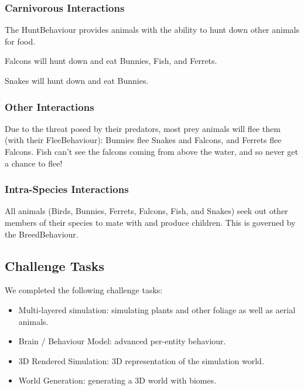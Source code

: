 \documentclass{article}
\begin{document}
\begin{multicols}{2}
            \subsubsection{Carnivorous Interactions}
            
            The HuntBehaviour provides animals with the ability to hunt down other animals for food.
            
            Falcons will hunt down and eat Bunnies, Fish, and Ferrets.
            
            Snakes will hunt down and eat Bunnies.
            
            \subsubsection{Other Interactions}
            
            Due to the threat posed by their predators, most prey animals will flee them (with their FleeBehaviour): Bunnies flee Snakes and Falcons, and Ferrets flee Falcons. Fish can't see the falcons coming from above the water, and so never get a chance to flee!
            
            \subsubsection{Intra-Species Interactions}
            
            All animals (Birds, Bunnies, Ferrets, Falcons, Fish, and Snakes) seek out other members of their species to mate with and produce children. This is governed by the BreedBehaviour.
        
        \subsection{Challenge Tasks}

            We completed the following challenge tasks:

            \begin{itemize}
                \setlength\itemsep{0.01em}
                \item Multi-layered simulation: simulating plants and other foliage as well as aerial animals.
                \item Brain / Behaviour Model: advanced per-entity behaviour.
                \item 3D Rendered Simulation: 3D representation of the simulation world.
                \item World Generation: generating a 3D world with biomes.
            \end{itemize}


\end{multicols}
\end{document}
